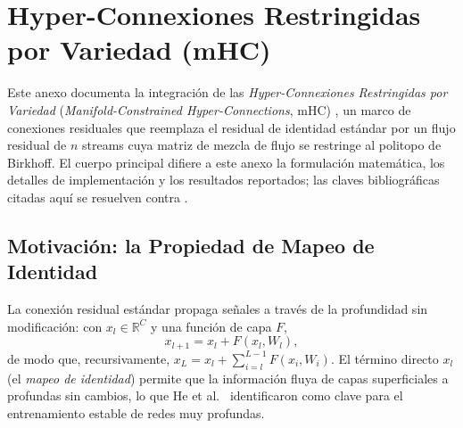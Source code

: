 \section{Hyper-Connexiones Restringidas por Variedad (mHC)}
\label{sec:annex-mhc}

Este anexo documenta la integración de las \emph{Hyper-Connexiones Restringidas
por Variedad} (\emph{Manifold-Constrained Hyper-Connections}, mHC)
\citep{xie_mhc_2025}, un marco de conexiones residuales que reemplaza el
residual de identidad estándar por un flujo residual de $n$ streams cuya
matriz de mezcla de flujo se restringe al politopo de Birkhoff. El cuerpo
principal difiere a este anexo la formulación matemática, los detalles de
implementación y los resultados reportados; las claves bibliográficas citadas
aquí se resuelven contra .

\subsection{Motivación: la Propiedad de Mapeo de Identidad}

La conexión residual estándar \citep{he_deep_2016} propaga señales a través de
la profundidad sin modificación: con $x_l \in \mathbb{R}^{C}$ y una función de
capa $F$,
\[
x_{l+1} = x_l + F(x_l, W_l),
\]
de modo que, recursivamente, $x_L = x_l + \sum_{i=l}^{L-1} F(x_i, W_i)$. El
término directo $x_l$ (el \emph{mapeo de identidad}) permite que la información
fluya de capas superficiales a profundas sin cambios, lo que He et
al.~\citep{he_deep_2016} identificaron como clave para el entrenamiento estable
de redes muy profundas.

